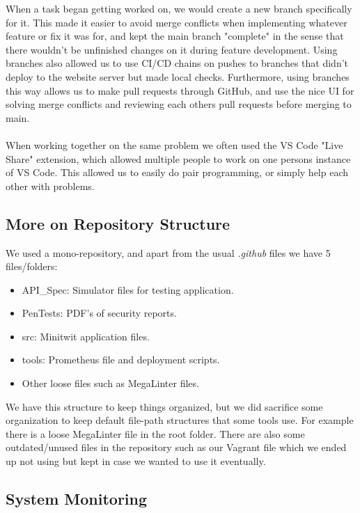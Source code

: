 When a task began getting worked on, we would create a new branch specifically for it. This made it easier to avoid merge conflicts when implementing whatever feature or fix it was for, and kept the main branch "complete" in the sense that there wouldn't be unfinished changes on it during feature development. Using branches also allowed us to use CI/CD chains on pushes to branches that didn't deploy to the website server but made local checks. Furthermore, using branches this way allows us to make pull requests through GitHub, and use the nice UI for solving merge conflicts and reviewing each others pull requests before merging to main.
\\\\
When working together on the same problem we often used the VS Code "Live Share" extension, which allowed multiple people to work on one persons instance of VS Code. This allowed us to easily do pair programming, or simply help each other with problems.

\subsection{More on Repository Structure}

We used a mono-repository, and apart from the usual \textit{.github} files we have 5 files/folders:

\begin{itemize}
    \item API\_Spec: Simulator files for testing application.
    \item PenTests: PDF's of security reports.
    \item src: Minitwit application files.
    \item tools: Prometheus file and deployment scripts.
    \item Other loose files such as MegaLinter files.
\end{itemize}

We have this structure to keep things organized, but we did sacrifice some organization to keep default file-path structures that some tools use. For example there is a loose MegaLinter file in the root folder. There are also some outdated/unused files in the repository such as our Vagrant file which we ended up not using but kept in case we wanted to use it eventually.

\subsection{System Monitoring}

